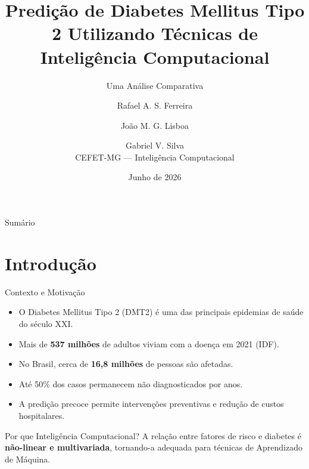 \documentclass[10pt]{beamer}
\title[Predição de Diabetes Tipo 2]{Predição de Diabetes Mellitus Tipo 2 Utilizando Técnicas de Inteligência Computacional}
\subtitle{Uma Análise Comparativa}
\author[Rafael et al.]{Rafael A. S. Ferreira \and João M. G. Lisboa \and Gabriel V. Silva \\[0.3em] CEFET-MG --- Inteligência Computacional}
\institute[CEFET-MG]{Centro Federal de Educação Tecnológica de Minas Gerais \\ Campus V --- Divinópolis}
\date{Junho de 2026}
\begin{document}
\frame{\titlepage}

\begin{frame}{Sumário}
    \tableofcontents
\end{frame}

\section{Introdução}
\begin{frame}{Contexto e Motivação}
    \begin{itemize}
        \item O Diabetes Mellitus Tipo 2 (DMT2) é uma das principais epidemias de saúde do século XXI.
        \item Mais de \textbf{537 milhões} de adultos viviam com a doença em 2021 (IDF).
        \item No Brasil, cerca de \textbf{16,8 milhões} de pessoas são afetadas.
        \item Até 50\% dos casos permanecem não diagnosticados por anos.
        \item A predição precoce permite intervenções preventivas e redução de custos hospitalares.
    \end{itemize}
    \vspace{0.3cm}
    \begin{block}{Por que Inteligência Computacional?}
        A relação entre fatores de risco e diabetes é \textbf{não-linear e multivariada}, tornando-a adequada para técnicas de Aprendizado de Máquina.
    \end{block}
\end{frame}
\end{document}
